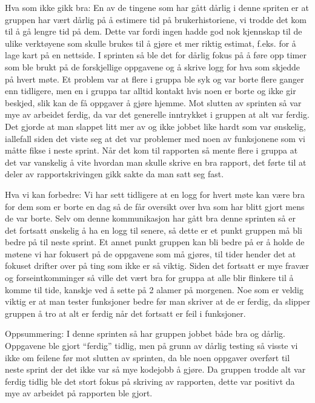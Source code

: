 \documentclass[12pt,a4paper,norsk]{article}
\begin{document}
Hva som ikke gikk bra:
En av de tingene som har gått dårlig i denne spriten er at gruppen har vært dårlig på å estimere tid på brukerhistoriene, vi trodde det kom til å gå lengre tid på dem. Dette var fordi ingen hadde god nok kjennskap til de ulike verktøyene som skulle brukes til å gjøre et mer riktig estimat, f.eks. for å lage kart på en nettside.
I sprinten så ble det for dårlig fokus på å føre opp timer som ble brukt på de forskjellige oppgavene og å skrive logg for hva som skjedde på hvert møte. 
Et problem var at flere i gruppa ble syk og var borte flere ganger enn tidligere, men en i gruppa tar alltid kontakt hvis noen er borte og ikke gir beskjed, slik kan de få oppgaver å gjøre hjemme. 
Mot slutten av sprinten så var mye av arbeidet ferdig, da var det generelle inntrykket i gruppen at alt var ferdig. Det gjorde at man slappet litt mer av og ikke jobbet like hardt som var ønskelig, iallefall siden det viste seg at det var problemer med noen av funksjonene som vi måtte fikse i neste sprint. 
Når det kom til rapporten så mente flere i gruppa at det var vanskelig å vite hvordan man skulle skrive en bra rapport, det førte til at deler av rapportskrivingen gikk sakte da man satt seg fast.

Hva vi kan forbedre:
Vi har sett tidligere at en logg for hvert møte kan være bra for dem som er borte en dag så de får oversikt over hva som har blitt gjort mens de var borte. Selv om denne kommunikasjon har gått bra denne sprinten så er det fortsatt ønskelig å ha en logg til senere, så dette er et punkt gruppen må bli bedre på til neste sprint. 
Et annet punkt gruppen kan bli bedre på er å holde de møtene vi har fokusert på de oppgavene som må gjøres, til tider hender det at fokuset drifter over på ting som ikke er så viktig. Siden det fortsatt er mye fravær og forseintkomminger så ville det vært bra for gruppa at alle blir flinkere til å komme til tide, kanskje ved å sette på 2 alamer på morgenen.   
Noe som er veldig viktig er at man tester funksjoner bedre før man skriver at de er ferdig, da slipper gruppen å tro at alt er ferdig når det fortsatt er feil i funksjoner. 

Oppsummering:
I denne sprinten så har gruppen jobbet både bra og dårlig. Oppgavene ble gjort “ferdig” tidlig, men på grunn av dårlig testing så visste vi ikke om feilene før mot slutten av sprinten, da ble noen oppgaver overført til neste sprint der det ikke var så mye kodejobb å gjøre. Da gruppen trodde alt var ferdig tidlig ble det stort fokus på skriving av rapporten, dette var positivt da mye av arbeidet på rapporten ble gjort.
\end{document}
